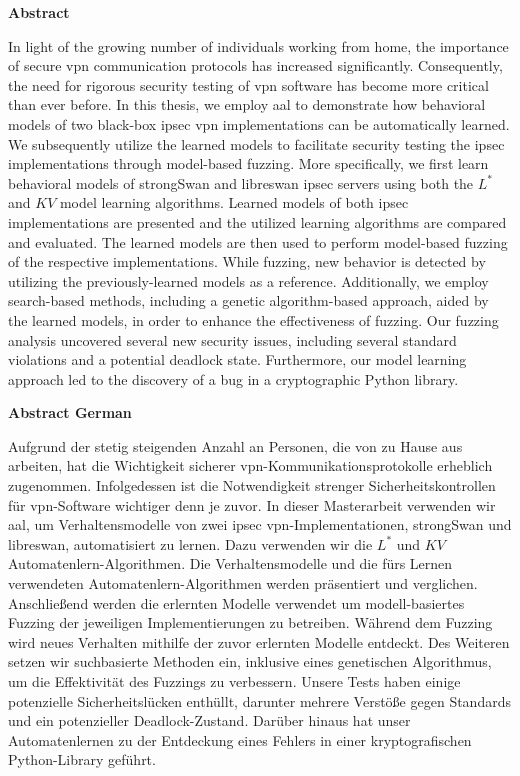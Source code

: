 

\cleardoublepage

\vspace*{2cm}

\begin{center}
{\Large\sffamily\bfseries Abstract}
\end{center}
In light of the growing number of individuals working from home, the importance of secure \acl{vpn} communication protocols has increased significantly. Consequently, the need for rigorous security testing of \acl{vpn} software has become more critical than ever before. 
In this thesis, we employ \acl{aal} to demonstrate how behavioral models of two black-box \acl{ipsec} \acl{vpn} implementations can be automatically learned. We subsequently utilize the learned models to facilitate security testing the \acl{ipsec} implementations through model-based fuzzing. 
More specifically, we first learn behavioral models of strongSwan and libreswan \acl{ipsec} servers using both the $L^*$ and $KV$ model learning algorithms. Learned models of both \acl{ipsec} implementations are presented and the utilized learning algorithms are compared and evaluated. The learned models are then used to perform model-based fuzzing of the respective implementations. While fuzzing, new behavior is detected by utilizing the previously-learned models as a reference. Additionally, we employ search-based methods, including a genetic algorithm-based approach, aided by the learned models, in order to enhance the effectiveness of fuzzing. Our fuzzing analysis uncovered several new security issues, including several standard violations and a potential deadlock state. Furthermore, our model learning approach led to the discovery of a bug in a cryptographic Python library.

\begin{center}
	{\Large\sffamily\bfseries Abstract German}
\end{center}
Aufgrund der stetig steigenden Anzahl an Personen, die von zu Hause aus arbeiten, hat die Wichtigkeit sicherer \acl{vpn}-Kommunikationsprotokolle erheblich zugenommen. Infolgedessen ist die Notwendigkeit strenger Sicherheitskontrollen für \acl{vpn}-Software wichtiger denn je zuvor. In dieser Masterarbeit verwenden wir \acl{aal}, um Verhaltensmodelle von zwei \acl{ipsec} \acl{vpn}-Implementationen, strongSwan und libreswan, automatisiert zu lernen. Dazu verwenden wir die $L^*$ und $KV$ Automatenlern-Algorithmen. Die Verhaltensmodelle und die fürs Lernen verwendeten Automatenlern-Algorithmen werden präsentiert und verglichen. Anschließend werden die erlernten Modelle verwendet um modell-basiertes Fuzzing der jeweiligen Implementierungen zu betreiben. Während dem Fuzzing wird neues Verhalten mithilfe der zuvor erlernten Modelle entdeckt. Des Weiteren setzen wir suchbasierte Methoden ein, inklusive eines genetischen Algorithmus, um die Effektivität des Fuzzings zu verbessern. Unsere Tests haben einige potenzielle Sicherheitslücken enthüllt, darunter mehrere Verstöße gegen Standards und ein potenzieller Deadlock-Zustand. Darüber hinaus hat unser Automatenlernen zu der Entdeckung eines Fehlers in einer kryptografischen Python-Library geführt.
